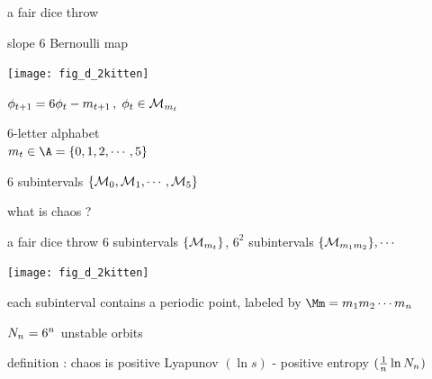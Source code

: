 \renewcommand{\ssp}{\ensuremath{\phi}}             %

\begin{frame}{a fair dice throw}
    \begin{block}{slope ${6}$ Bernoulli map}
\begin{center}
            \begin{minipage}[c]{0.32\textwidth}\begin{center}
\texttt{[image: fig\_d\_2kitten]} %
            \end{center}\end{minipage}
            \hspace{2ex}
            \begin{minipage}[c]{0.46\textwidth}
\(
\ssp_{\zeit+1}
= {6} \ssp_{\zeit} - \Ssym{\zeit+1}
\,,\;  \ssp_{\zeit}\in\pS_{\Ssym{\zeit}}
\)
\medskip

${6}$-letter alphabet \\
\(
\Ssym{\zeit} \in \A=\{0,1,2,\cdots,5\}
\)
            \end{minipage}
\end{center}
$6$ subintervals $\{{\cal M}_{0},{\cal M}_{1},\cdots,{\cal M}_{5}\}$
    \end{block}
\end{frame} %

\begin{frame}{what is chaos ?}
    \begin{block}{a fair dice throw}
$6$ subintervals $\{{\cal M}_{{m_{t}}}\}$,
$6^2$ subintervals $\{{\cal M}_{{m_{1}}{m_{2}}}\}, \cdots$
\begin{center}
            \begin{minipage}[c]{0.32\textwidth}\begin{center}
\texttt{[image: fig\_d\_2kitten]} %
            \end{center}\end{minipage}
            \hspace{2ex}
            \begin{minipage}[c]{0.46\textwidth}
each subinterval contains a periodic point,
labeled by
$\Mm=\Ssym{1}\Ssym{2}\cdots\Ssym{\cl{}}$
\bigskip

$N_{n_{}} = 6^{n_{}}$ {\color{red}unstable} orbits
            \end{minipage}
\end{center}
    \end{block}
\vfill
    \begin{block}{definition : chaos is}
positive Lyapunov $(\ln s)$ - positive entropy $(\frac{1}{{n_{}}}\ln N_{n_{}})$
    \end{block}
\end{frame} %

